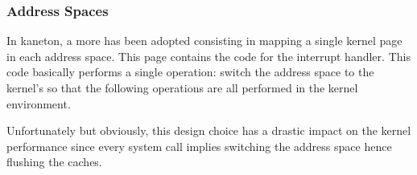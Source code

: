
\begin{frame}
  \frametitle{Address Spaces}

  In kaneton, a more  has been adopted consisting
  in mapping a single kernel page in each address space. This page contains
  the code for the interrupt handler. This code basically performs a single
  operation: switch the address space to the kernel's so that the following
  operations are all performed in the kernel environment.

  \-

  Unfortunately but obviously, this design choice has a drastic impact on
  the kernel performance since every system call implies switching the
  address space hence flushing the caches.
\end{frame}


